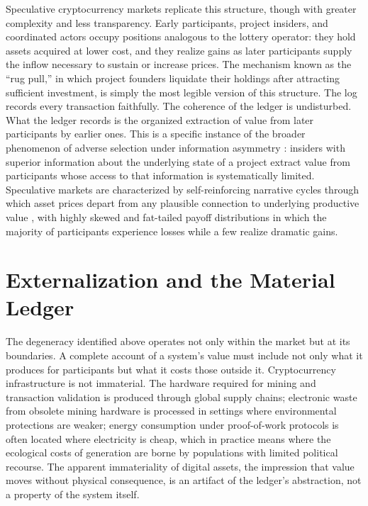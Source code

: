 Speculative cryptocurrency markets replicate this structure, though with greater complexity and less transparency. Early participants, project insiders, and coordinated actors occupy positions analogous to the lottery operator: they hold assets acquired at lower cost, and they realize gains as later participants supply the inflow necessary to sustain or increase prices. The mechanism known as the ``rug pull,'' in which project founders liquidate their holdings after attracting sufficient investment, is simply the most legible version of this structure. The log records every transaction faithfully. The coherence of the ledger is undisturbed. What the ledger records is the organized extraction of value from later participants by earlier ones. This is a specific instance of the broader phenomenon of adverse selection under information asymmetry \cite{akerlof1970}: insiders with superior information about the underlying state of a project extract value from participants whose access to that information is systematically limited. Speculative markets are characterized by self-reinforcing narrative cycles through which asset prices depart from any plausible connection to underlying productive value \cite{shiller2000}, with highly skewed and fat-tailed payoff distributions in which the majority of participants experience losses while a few realize dramatic gains.

\section{Externalization and the Material Ledger}

The degeneracy identified above operates not only within the market but at its boundaries. A complete account of a system's value must include not only what it produces for participants but what it costs those outside it. Cryptocurrency infrastructure is not immaterial. The hardware required for mining and transaction validation is produced through global supply chains; electronic waste from obsolete mining hardware is processed in settings where environmental protections are weaker; energy consumption under proof-of-work protocols is often located where electricity is cheap, which in practice means where the ecological costs of generation are borne by populations with limited political recourse. The apparent immateriality of digital assets, the impression that value moves without physical consequence, is an artifact of the ledger's abstraction, not a property of the system itself.

